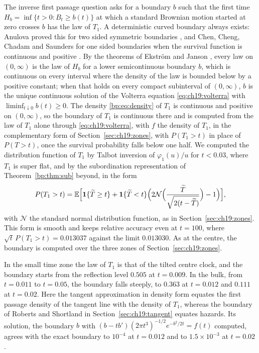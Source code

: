 The inverse first passage question asks for a boundary $b$ such that the first time $H_b=\inf\{t>0:B_t\ge b(t)\}$ at which a standard Brownian motion started at zero crosses $b$ has the law of $T_1$. A deterministic curved boundary always exists: Anulova proved this for two sided symmetric boundaries \cite{Anulova80}, and Chen, Cheng, Chadam and Saunders for one sided boundaries when the survival function is continuous and positive \cite[Theorem 1]{CCCS11}. By the theorems of Ekstr\"om and Janson \cite[Theorems 2.3, 8.2 and 9.2]{EkstromJanson16}, every law on $(0,\infty)$ is the law of $H_b$ for a lower semicontinuous boundary $b$, which is continuous on every interval where the density of the law is bounded below by a positive constant; when that holds on every compact subinterval of $(0,\infty)$, $b$ is the unique continuous solution of the Volterra equation \eqref{eq:ch19:volterra} with $\liminf_{t\downarrow0}b(t)\ge0$. The density \eqref{bp:eq:density} of $T_1$ is continuous and positive on $(0,\infty)$, so the boundary of $T_1$ is continuous there and is computed from the law of $T_1$ alone through \eqref{eq:ch19:volterra}, with $f$ the density of $T_1$, in the complementary form of Section~\ref{sec:ch19:zones}, with $P(T_1>t)$ in place of $P(T>t)$, once the survival probability falls below one half. We computed the distribution function of $T_1$ by Talbot inversion of $\varphi_1(u)/u$ for $t<0.03$, where $T_1$ is super flat, and by the subordination representation of Theorem~\ref{bp:thm:sub} beyond, in the form
\[
P(T_1>t)=\mathbb{E}\Big[\mathbf 1\{\widetilde T\ge t\}+\mathbf 1\{\widetilde T<t\}\Big(2\mathcal N\Big(\frac{\widetilde T}{\sqrt{2(t-\widetilde T)}}\Big)-1\Big)\Big],
\]
with $\mathcal N$ the standard normal distribution function, as in Section~\ref{sec:ch19:zones}. This form is smooth and keeps relative accuracy even at $t=100$, where $\sqrt t\,P(T_1>t)=0.013037$ against the limit $0.013030$. As at the centre, the boundary is computed over the three zones of Section~\ref{sec:ch19:zones}.

In the small time zone the law of $T_1$ is that of the tilted centre clock, and the boundary starts from the reflection level $0.505$ at $t=0.009$. In the bulk, from $t=0.011$ to $t=0.05$, the boundary falls steeply, to $0.363$ at $t=0.012$ and $0.111$ at $t=0.02$. Here the tangent approximation in density form equates the first passage density of the tangent line with the density of $T_1$, whereas the boundary of Roberts and Shortland \cite{RS95} in Section~\ref{sec:ch19:tangent} equates hazards. Its solution, the boundary $b$ with $(b-tb')(2\pi t^3)^{-1/2}e^{-b^2/2t}=f(t)$ computed, agrees with the exact boundary to $10^{-4}$ at $t=0.012$ and to $1.5\times10^{-3}$ at $t=0.02$.

